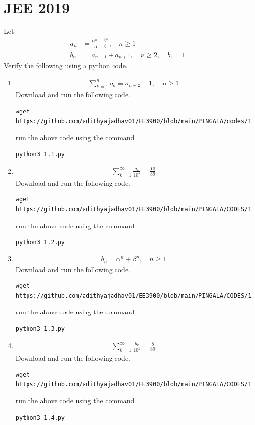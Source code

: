 \documentclass[journal,12pt,twocolumn]{IEEEtran}
\renewcommand\thesection{\arabic{section}}
\begin{document}
\section{JEE 2019}
Let 
\begin{align}
	a_n &= \frac{\alpha^{n}-\beta^{n}}{\alpha - \beta}, \quad n \ge 1
	\\
	b_n &= a_{n-1} + a_{n+1}, \quad n \ge 2, \quad b_1 =1
	\label{eq:10-orig-diff}
\end{align}
Verify the following using a python code.
\begin{enumerate}[label=\thesection.\arabic*
,ref=\thesection.\theenumi]
\item 
\begin{align}
	\sum_{k=1}^{n}a_k = a_{n+2}-1, \quad n \ge 1
\end{align}
\solution Download and run the following code.
\begin{lstlisting}
wget https://github.com/adithyajadhav01/EE3900/blob/main/PINGALA/codes/1.1.py
\end{lstlisting}
run the above code using the command
\begin{lstlisting}
python3 1.1.py
\end{lstlisting}

\item 
\begin{align}
	\sum_{k=1}^{\infty}\frac{a_k}{10^k} =\frac{10}{89}
\end{align}
\solution Download and run the following code.
\begin{lstlisting}
wget https://github.com/adithyajadhav01/EE3900/blob/main/PINGALA/CODES/1.2.py
\end{lstlisting}
run the above code using the command
\begin{lstlisting}
python3 1.2.py
\end{lstlisting}

\item 
\begin{align}
	b_n =\alpha^n + \beta^n, \quad n \ge 1
\end{align}
\solution Download and run the following code.
\begin{lstlisting}
wget https://github.com/adithyajadhav01/EE3900/blob/main/PINGALA/CODES/1.3.py
\end{lstlisting}
run the above code using the command
\begin{lstlisting}
python3 1.3.py
\end{lstlisting}

\item 
\begin{align}
	\sum_{k=1}^{\infty}\frac{b_k}{10^k} =\frac{8}{89}
\end{align}
\solution Download and run the following code.
\begin{lstlisting}
wget https://github.com/adithyajadhav01/EE3900/blob/main/PINGALA/CODES/1.4.py
\end{lstlisting}
run the above code using the command
\begin{lstlisting}
python3 1.4.py
\end{lstlisting}


\end{enumerate}
\end{document}
